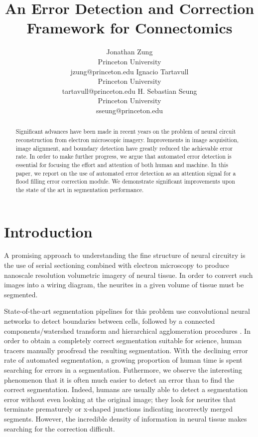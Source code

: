 \documentclass{article}
\title{An Error Detection and Correction Framework for Connectomics}
\author{
	Jonathan Zung\\
	Princeton University\\
	jzung@princeton.edu
	\And
	Ignacio Tartavull\\
	Princeton University\\
	tartavull@princeton.edu
	\And
	H. Sebastian Seung\\
	Princeton University\\
	sseung@princeton.edu
	\And
}
\begin{document}
\maketitle

\begin{abstract}
	Significant advances have been made in recent years on the problem
	of neural circuit reconstruction from electron microscopic imagery.
	Improvements in image acquisition, image alignment, and boundary
	detection have greatly reduced the achievable error rate. In order to make
	further progress, we argue that automated error detection is 
	essential for focusing the effort and attention of both human
	and machine. In this paper, we report on the use of automated
	error detection as an attention signal for a flood filling error 
	correction module. We demonstrate significant improvements upon 
	the state of the art in segmentation performance.
\end{abstract}

\section{Introduction}
A promising approach to understanding the fine structure of neural circuitry is the use of serial sectioning combined with electron microscopy to produce nanoscale resolution volumetric imagery of neural tissue. In order to convert such images into a wiring diagram, the neurites in a given volume of tissue must be segmented.

State-of-the-art segmentation pipelines for this problem use convolutional neural networks to detect boundaries between cells, followed by a connected components/watershed transform and hierarchical agglomeration procedures \cite{boundary_detection,kisuk}. In order to obtain a completely correct segmentation suitable for science, human tracers manually proofread the resulting segmentation. With the declining error rate of automated segmentation, a growing proportion of human time is spent searching for errors in a segmentation. Futhermore, we observe the interesting phenomenon that it is often much easier to detect an error than to find the correct segmentation. Indeed, humans are usually able to detect a segmentation error without even looking at the original image; they look for neurites that terminate prematurely or x-shaped junctions indicating incorrectly merged segments. However, the incredible density of information in neural tissue makes searching for the correction difficult.
\end{document}
